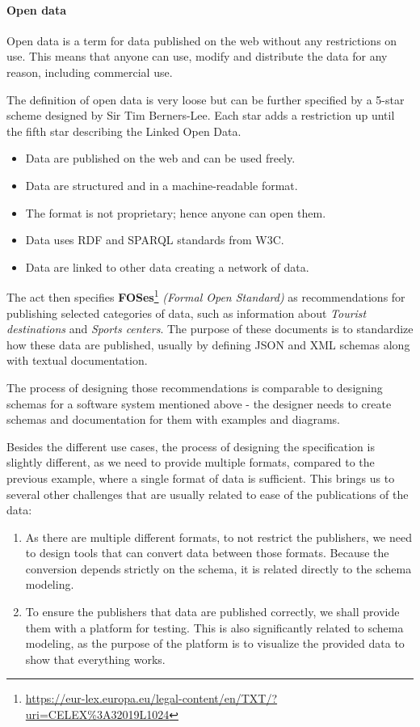 \paragraph{Open data} Open data is a term for data published on the web without any restrictions on use. This means that anyone can use, modify and distribute the data for any reason, including commercial use.

The definition of open data is very loose but can be further specified by a 5-star scheme designed by Sir Tim Berners-Lee. Each star adds a restriction up until the fifth star describing the Linked Open Data.
\begin{itemize}[noitemsep,leftmargin=2cm]
    \item [1 $\bigstar$] Data are published on the web and can be used freely.
    \item [2 $\bigstar$] Data are structured and in a machine-readable format.
    \item [3 $\bigstar$] The format is not proprietary; hence anyone can open them.
    \item [4 $\bigstar$] Data uses RDF and SPARQL standards from W3C.
    \item [5 $\bigstar$] Data are linked to other data creating a network of data.
\end{itemize}

\bigskip

The act then specifies \textbf{FOSes}\footnote{\url{https://eur-lex.europa.eu/legal-content/en/TXT/?uri=CELEX\%3A32019L1024}} \textit{(Formal Open Standard)} as recommendations for publishing selected categories of data, such as information about \textit{Tourist destinations} and \textit{Sports centers}. The purpose of these documents is to standardize how these data are published, usually by defining JSON and XML schemas along with textual documentation.

The process of designing those recommendations is comparable to designing schemas for a software system mentioned above - the designer needs to create schemas and documentation for them with examples and diagrams.

Besides the different use cases, the process of designing the specification is slightly different, as we need to provide multiple formats, compared to the previous example, where a single format of data is sufficient. This brings us to several other challenges that are usually related to ease of the publications of the data:
\begin{enumerate}
  \item As there are multiple different formats, to not restrict the publishers, we need to design tools that can convert data between those formats. Because the conversion depends strictly on the schema, it is related directly to the schema modeling.
  \item To ensure the publishers that data are published correctly, we shall provide them with a platform for testing. This is also significantly related to schema modeling, as the purpose of the platform is to visualize the provided data to show that everything works.
\end{enumerate}

